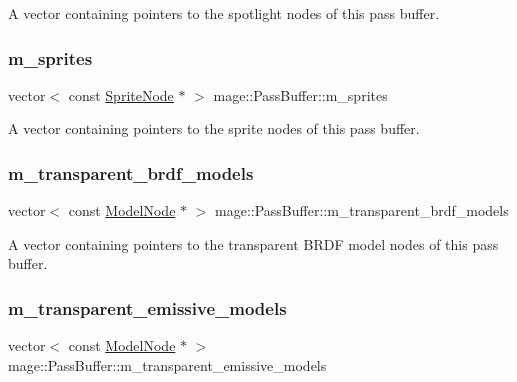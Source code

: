 A vector containing pointers to the spotlight nodes of this pass buffer. \hypertarget{structmage_1_1_pass_buffer_ad742ad6712a63e9d58621da83a7fb900}{}\label{structmage_1_1_pass_buffer_ad742ad6712a63e9d58621da83a7fb900} 
\subsubsection{\texorpdfstring{m\+\_\+sprites}{m\_sprites}}
{\footnotesize\ttfamily vector$<$ const \hyperlink{classmage_1_1_sprite_node}{Sprite\+Node} $\ast$ $>$ mage\+::\+Pass\+Buffer\+::m\+\_\+sprites\hspace{0.3cm}{\ttfamily [private]}}

A vector containing pointers to the sprite nodes of this pass buffer. \hypertarget{structmage_1_1_pass_buffer_a2697c5e89c8e654ada78cbf15f5e8067}{}\label{structmage_1_1_pass_buffer_a2697c5e89c8e654ada78cbf15f5e8067} 
\subsubsection{\texorpdfstring{m\+\_\+transparent\+\_\+brdf\+\_\+models}{m\_transparent\_brdf\_models}}
{\footnotesize\ttfamily vector$<$ const \hyperlink{classmage_1_1_model_node}{Model\+Node} $\ast$ $>$ mage\+::\+Pass\+Buffer\+::m\+\_\+transparent\+\_\+brdf\+\_\+models\hspace{0.3cm}{\ttfamily [private]}}

A vector containing pointers to the transparent B\+R\+DF model nodes of this pass buffer. \hypertarget{structmage_1_1_pass_buffer_a6eeb7390dcdc25022e887ce110ff1fff}{}\label{structmage_1_1_pass_buffer_a6eeb7390dcdc25022e887ce110ff1fff} 
\subsubsection{\texorpdfstring{m\+\_\+transparent\+\_\+emissive\+\_\+models}{m\_transparent\_emissive\_models}}
{\footnotesize\ttfamily vector$<$ const \hyperlink{classmage_1_1_model_node}{Model\+Node} $\ast$ $>$ mage\+::\+Pass\+Buffer\+::m\+\_\+transparent\+\_\+emissive\+\_\+models\hspace{0.3cm}{\ttfamily [private]}}

